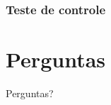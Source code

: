 \documentclass{beamer}
\begin{document}
\begin{frame}
	\frametitle{Teste de controle}
	\begin{center}
	\end{center}
\end{frame}
\section{Perguntas}
\begin{frame}
\Huge{\centerline{Perguntas?}}
\end{frame}

\end{document}
